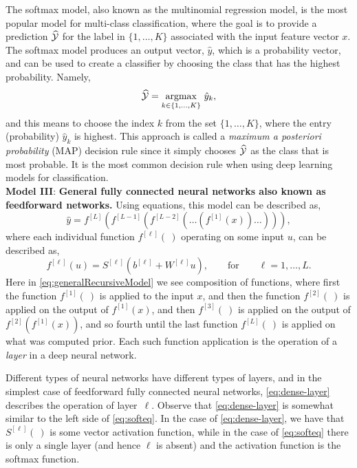 \documentclass[12pt]{article}
\begin{document}
The softmax model, also known as the multinomial regression model, is the most popular model for multi-class classification, where the goal is to provide a prediction $\widehat{\cal Y}$ for the label in $\{1,\ldots,K\}$ associated with the input feature vector $x$.  The softmax model produces an output vector, $\hat{y}$, which is a probability vector, and can be used to create a classifier by choosing the class that has the highest probability. Namely,
%
\begin{equation}
\label{eq:argmax-mp}
\widehat{\cal Y}=\underset{k \in\{1, \ldots, K\}}{\operatorname{argmax}} ~\hat{y}_k,
\end{equation}
%
and this means to choose the index $k$ from the set $\{1,\ldots,K\}$, where the entry (probability) $\hat{y}_k$ is highest. 
This approach is called a \textit{maximum a posteriori probability} (MAP) decision rule since it simply chooses $\widehat{\cal Y}$ as the class that is most probable. It is the most common decision rule when using deep learning models for classification. \\

\noindent
{\bf Model III}: {\bf General fully connected neural networks also known as feedforward networks.} Using equations, this model can be described as,
%
\begin{equation}
\label{eq:generalRecursiveModel}
\hat{y}=f^{[L]}(f^{[L-1]}(f^{[L-2]}(\ldots (f^{[1]}(x))\ldots))),
\end{equation}
%
where each individual function $f^{[\ell]}(~)$ operating on some input $u$, can be  described as,
%
\begin{equation}
\label{eq:dense-layer}
f^{[\ell]}(u) =
S^{[\ell]}(b^{[\ell]} + W^{[\ell]} u),
\qquad
\text{for}
\qquad
\ell = 1,\ldots,L.
\end{equation}
%
Here in \eqref{eq:generalRecursiveModel} we see composition of functions, where first the function $f^{[1]}(~)$ is applied to the input $x$, and then the function $f^{[2]}(~)$ is applied on the output of $f^{[1]}(x)$, and then $f^{[3]}(~)$ is applied on the output of $f^{[2]}(f^{[1]}(x))$, and so fourth until the last function $f^{[L]}(~)$ is applied on what was computed prior. Each such function application is the operation of a {\em layer} in a deep neural network. 

Different types of neural networks have different types of layers, and in the simplest case of feedforward fully connected neural networks, \eqref{eq:dense-layer} describes the operation of layer~$\ell$. Observe that \eqref{eq:dense-layer} is somewhat similar to the left side of \eqref{eq:softeq}. In the case of \eqref{eq:dense-layer}, we have that $S^{[\ell]}(~)$ is some vector activation function, while in the case of \eqref{eq:softeq} there is only a single layer (and hence $\ell$ is absent) and the activation function is the softmax function.  
\end{document}

